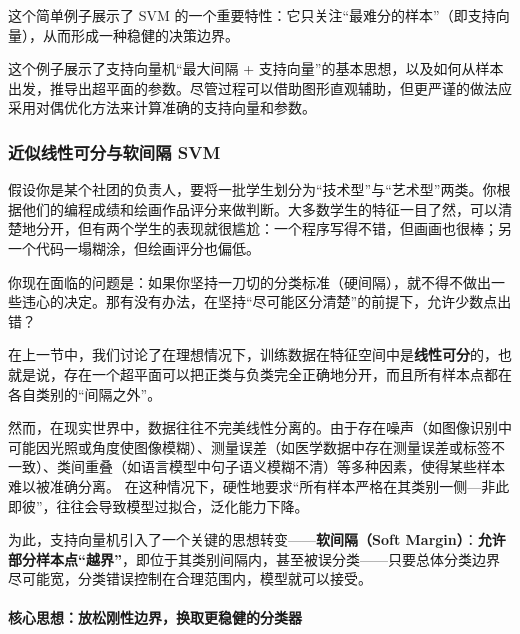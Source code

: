 这个简单例子展示了 SVM 的一个重要特性：它只关注“最难分的样本”（即支持向量），从而形成一种稳健的决策边界。

这个例子展示了支持向量机“最大间隔 + 支持向量”的基本思想，以及如何从样本出发，推导出超平面的参数。尽管过程可以借助图形直观辅助，但更严谨的做法应采用对偶优化方法来计算准确的支持向量和参数。

\subsubsection{近似线性可分与软间隔 SVM}

假设你是某个社团的负责人，要将一批学生划分为“技术型”与“艺术型”两类。你根据他们的编程成绩和绘画作品评分来做判断。大多数学生的特征一目了然，可以清楚地分开，但有两个学生的表现就很尴尬：一个程序写得不错，但画画也很棒；另一个代码一塌糊涂，但绘画评分也偏低。

你现在面临的问题是：如果你坚持一刀切的分类标准（硬间隔），就不得不做出一些违心的决定。那有没有办法，在坚持“尽可能区分清楚”的前提下，允许少数点出错？

在上一节中，我们讨论了在理想情况下，训练数据在特征空间中是\textbf{线性可分}的，也就是说，存在一个超平面可以把正类与负类完全正确地分开，而且所有样本点都在各自类别的“间隔之外”。

然而，在现实世界中，数据往往不完美线性分离的。由于存在噪声（如图像识别中可能因光照或角度使图像模糊）、测量误差（如医学数据中存在测量误差或标签不一致）、类间重叠（如语言模型中句子语义模糊不清）等多种因素，使得某些样本难以被准确分离。
在这种情况下，硬性地要求“所有样本严格在其类别一侧---非此即彼”，往往会导致模型过拟合，泛化能力下降。

为此，支持向量机引入了一个关键的思想转变——\textbf{软间隔（Soft Margin）}：\textbf{允许部分样本点“越界”}，即位于其类别间隔内，甚至被误分类——只要总体分类边界尽可能宽，分类错误控制在合理范围内，模型就可以接受。

\paragraph{核心思想：放松刚性边界，换取更稳健的分类器}

